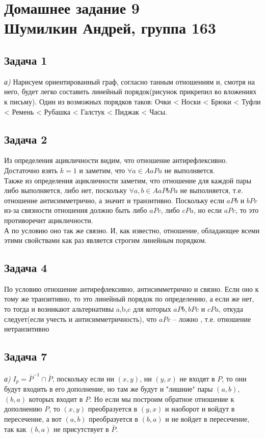 

	\section{Домашнее задание 9\\ Шумилкин Андрей, группа 163} 
	\subsection{Задача 1}
	\textit{а)} Нарисуем ориентированный граф, согласно танным отношениям и, смотря на него, будет легко составить линейный порядок(рисунок прикрепил во вложениях к письму). Один из возможных порядков таков: Очки < Носки < Брюки < Туфли < Ремень < Рубашка < Галстук < Пиджак < Часы.
	
	\subsection{Задача 2}
	Из определения ацикличности видим, что отношение антирефлексивно. Достаточно взять $k=1$ и заметим, что $\forall a \in A aPa$ не выполняется. \\
	Также из определения ацикличности заметим, что отношение для каждой пары либо выполняется, либо нет, поскольку $\forall a, b \in A aPbPa$ не выполняется, т.е. отношение антисимметрично, а значит и транзитивно. Поскольку если $aPb$ и $bPc$ из-за связности отношения должно быть либо $aPc$, либо $cPa$, но если $aPc$, то это противоречит ацикличности. \\
    А по условию оно так же связно. И, как известно, отношение, обладающее всеми этими свойствами как раз является строгим линейным порядком.
     
     \subsection{Задача 4} 
     По условию отношение антирефлексивно, антисимметрично и связно. Если оно к тому же транзитивно, то это линейный порядок по определению, а если же нет, то тогда и возникают альтернативы a,b,c для которых $aPb, bPc$ и $cPa$, откуда следует(если учесть и антисимметричность), что $aPc$ -- ложно , т.е. отношение нетранзитивно 
     
     \subsection{Задача 7}
     \textit{а)} $I_p = \bar{P} ^{-1} \cap \bar{P}$, поскольку если ни $(x, y)$, ни $(y, x)$ не входят в $P$, то они будут входить в его дополнение, но там же будут и "лишние" пары $(a, b)$, $(b, a)$ которых входит в $P$. Но если мы построим обратное отношение к дополнению $P$, то $(x,y)$ преобразуется в $(y, x)$ и наоборот и войдут в пересечение, а вот $(a, b)$ преобразуется в $(b,a)$ и не войдет в пересечение, так как $(b,a)$ не присутствует в $\bar{P}$.

